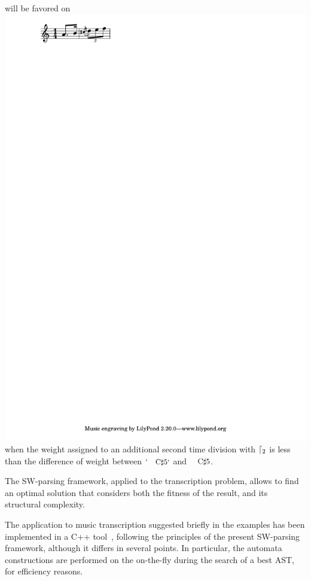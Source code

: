 \begin{example}
will be favored on
\includegraphics[scale=0.35,trim=0 5mm 0 0]{pictures/ex2.pdf}
when the weight assigned to an additional second time division with $\lceil_{2}$ is less
than the difference of weight between
$\mbox{`\footnotesize C$\sharp$5`}$
and $\mbox{\footnotesize C$\sharp$5}$.

\noindent
The SW-parsing framework, applied to the transcription problem,
allows to find an optimal solution
that considers both the fitness of the result,
and its structural complexity.
\endex
\end{example}
The application to music transcription suggested briefly in the examples
has been implemented in a C++ tool~\cite{qparse}, %
following the principles of the present SW-parsing framework, 
although it differs in several points.
In particular, the automata constructions are performed on the on-the-fly
during the search of a best AST, for efficiency reasons.



